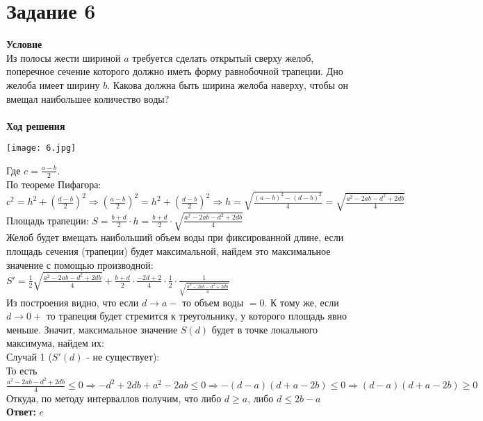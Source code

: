 
\newpage
\section{Задание 6}
{\bf\large Условие}\\
Из полосы жести шириной $a$ требуется сделать открытый сверху
желоб, поперечное сечение которого должно иметь форму равнобочной
трапеции. Дно желоба имеет ширину $b$. Какова должна быть ширина
желоба наверху, чтобы он вмещал наибольшее количество воды? \\
\\
{\bf\large Ход решения}
\begin{center}\texttt{[image: 6.jpg]}\end{center}
Где $c = \frac{a-b}{2}$. \\
По теореме Пифагора: $c^2 = h^2 + \left(\frac{d-b}{2}\right)^2 \Rightarrow \left(\frac{a-b}{2}\right)^2 = h^2 + \left(\frac{d-b}{2}\right)^2
\Rightarrow h = \sqrt{\frac{(a-b)^2-(d-b)^2}{4}} = \sqrt{\frac{a^2-2ab-d^2+2db}{4}}$ \\
Площадь трапеции: $S = \frac{b+d}{2}\cdot h = \frac{b+d}{2} \cdot \sqrt{\frac{a^2-2ab-d^2+2db}{4}}$ \\
Желоб будет вмещать наибольший объем воды при фиксированной длине, если площадь сечения (трапеции) будет максимальной, найдем это максимальное значение с помощью производной: \\
$S' = \frac{1}{2} \sqrt{\frac{a^2-2ab-d^2+2db}{4}} + \frac{b+d}{2} \cdot \frac{-2d+2}{4} \cdot \frac{1}{2} \cdot \frac{1}{\sqrt{\frac{a^2-2ab-d^2+2db}{4}}}$ \\
Из построения видно, что если $d \rightarrow a-$ то объем воды $=0$. 
К тому же, если $d\rightarrow0+$ то трапеция будет стремится к треугольнику, у которого площадь явно меньше. 
Значит, максимальное значение $S(d)$ будет в точке локального максимума, найдем их: \\
Случай 1 ($S'(d)$ - не существует): \\
То есть $\frac{a^2-2ab-d^2+2db}{4}\leq0 \Rightarrow -d^2 + 2db +a^2-2ab\leq 0 \Rightarrow -(d-a)(d+a-2b)\leq 0 \Rightarrow (d-a)(d+a-2b)\geq 0$ \\
Откуда, по методу интерваллов получим, что либо $d\geq a$, либо $d\leq 2b-a$
\\
{\bf Ответ:} $e$
